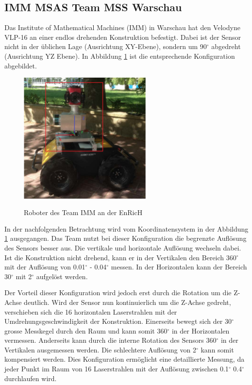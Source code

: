  \subsection{IMM MSAS Team MSS Warschau}
 	\label{subsec:IMM}
Das Institute of Mathematical Machines (IMM) in Warschau hat den Velodyne VLP-16 an einer endlos drehenden Konstruktion befestigt. Dabei ist der Sensor nicht in der üblichen Lage (Ausrichtung XY-Ebene), sondern um 90$^\circ$ abgedreht (Ausrichtung YZ Ebene). In Abbildung \ref{fig:imm} ist die entsprechende Konfiguration abgebildet. 

   \begin{figure}[H]
	\centering
	\includegraphics[width=0.6\textwidth]
	{resources/IMM_cop.PNG}
	\caption[Roboter des Team IMM EnRicH]{Roboter des Team IMM an der EnRicH} \protect\cite{IMM}
	\label{fig:imm}
\end{figure}

In der nachfolgenden Betrachtung wird vom Koordinatensystem in der Abbildung \ref{fig:imm} ausgegangen.
Das Team nutzt bei dieser Konfiguration die begrenzte Auflösung des Sensors besser aus. Die vertikale und horizontale Auflösung wechseln dabei. Ist die Konstruktion nicht drehend, kann er in der Vertikalen den Bereich 360$^\circ$ mit der Auflösung von 0.01$^\circ$ - 0.04$^\circ$ messen. In der Horizontalen kann der Bereich 30$^\circ$ mit 2$^\circ$ aufgelöst werden. 

Der Vorteil dieser Konfiguration wird jedoch erst durch die Rotation um die Z-Achse deutlich. Wird der Sensor nun kontinuierlich um die Z-Achse gedreht, verschieben sich die 16 horizontalen Laserstrahlen mit der Umdrehungsgeschwindigkeit der Konstruktion. Einerseits bewegt sich der 30$^\circ$ grosse Messkegel durch den Raum und kann somit 360$^\circ$ in der Horizontalen vermessen. Anderseits kann durch die interne Rotation des Sensors 360$^\circ$  in der Vertikalen ausgemessen werden. Die schlechtere Auflösung von 2$^\circ$ kann somit kompensiert werden. Dies Konfiguration ermöglicht eine detaillierte Messung, da jeder Punkt im Raum von 16 Laserstrahlen mit der Auflösung zwischen 0.1$^\circ$ 0.4$^\circ$ durchlaufen wird. 

